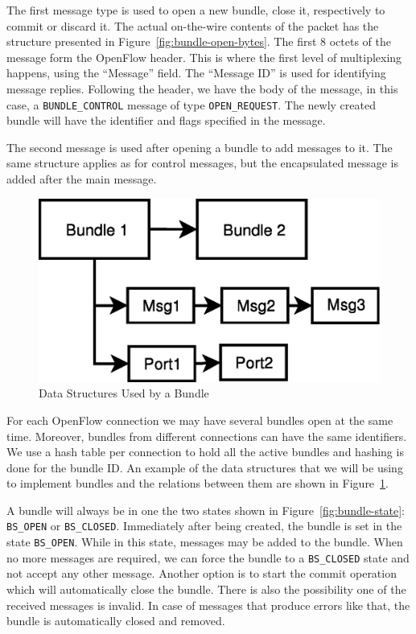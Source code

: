 The first message type is used to open a new bundle, close it, respectively to commit or discard it. The
actual on-the-wire contents of the packet has the structure presented in Figure~\ref{fig:bundle-open-bytes}.
The first $8$ octets of the message form the OpenFlow header. This is where the first level of multiplexing
happens, using the ``Message'' field. The ``Message ID'' is used for identifying message replies. Following the header,
we have the body of the message, in this case, a \texttt{BUNDLE_CONTROL} message of type \texttt{OPEN_REQUEST}. The newly
created bundle will have the identifier and flags specified in the message.


The second message is used after opening a bundle to add messages to it. The same structure applies as for control
messages, but the encapsulated message is added after the main message.

\begin{figure}[h]
\begin{center}
\includegraphics[scale=0.5]{src/img/bundle-content.eps}
\end{center}
\caption{Data Structures Used by a Bundle}
\label{fig:bundles}
\end{figure}

For each OpenFlow connection we may have several bundles open at the same time. Moreover, bundles from different connections
can have the same identifiers. We use a hash table per connection to hold all the active bundles and hashing is done for 
the bundle ID. An example of the data structures that we will be using to implement bundles and the relations between
them are shown in Figure~\ref{fig:bundles}.

A bundle will always be in one the two states shown in Figure~\ref{fig:bundle-state}: \texttt{BS_OPEN} or \texttt{BS_CLOSED}.
Immediately after being created, the bundle is set in the state \texttt{BS_OPEN}. While in this state, messages may be
added to the bundle. When no more messages are required, we can force the bundle to a \texttt{BS_CLOSED} state and not
accept any other message. Another option is to start the commit operation which will automatically close the bundle.
There is also the possibility one of the received messages is invalid. In case of messages that produce errors like that,
the bundle is automatically closed and removed.

